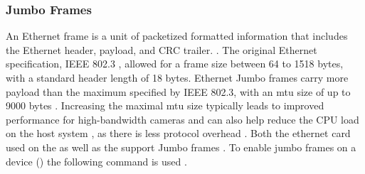 \subsubsection{Jumbo Frames}
An Ethernet frame is a unit of packetized formatted information that includes the Ethernet header, payload, and CRC trailer.
\cite{winterCisco3ComApplied2009}.
The original Ethernet specification, IEEE 802.3 \cite{ieeeIEEEStandardsInterpretation2002}, allowed for a frame size between 64 to 1518 bytes, with a standard header length of 18 bytes.
Ethernet Jumbo frames carry more payload than the maximum specified by IEEE 802.3, with an \gls{mtu} size of up to 9000 bytes \cite{lucidvisionlabsJumboFramesLUCID2020}.
Increasing the maximal \gls{mtu} size typically leads to improved performance for high-bandwidth cameras and can also help reduce the CPU load on the host system \cite{lucidvisionlabsJumboFramesLUCID2020}, as there is less protocol overhead \cite{lukeThingsYouShould2018}.
Both the ethernet card used on the \jx as well as the \cams support Jumbo frames \cite{IntelI350am4Chip} \cite{lucidvisionlabsTritonMPPolarized2020}.
To enable jumbo frames on a device () the following command is used .

